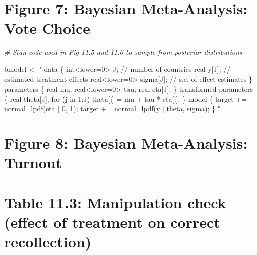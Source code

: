 \documentclass[]{article}
\newenvironment{Shaded}{\begin{snugshade}}{\end{snugshade}}
\newcommand{\StringTok}[1]{\textcolor[rgb]{0.31,0.60,0.02}{{#1}}}
\newcommand{\CommentTok}[1]{\textcolor[rgb]{0.56,0.35,0.01}{\textit{{#1}}}}
\newcommand{\NormalTok}[1]{{#1}}
\begin{document}
\clearpage

\section{Figure 7: Bayesian Meta-Analysis: Vote
Choice}\label{figure-7-bayesian-meta-analysis-vote-choice}

\begin{Shaded}
\begin{Highlighting}[]
\CommentTok{# Stan code used in Fig 11.5 and 11.6 to sample from posterior distributions}

  \NormalTok{bmodel <-}\StringTok{ "}
\StringTok{  data \{}
\StringTok{    int<lower=0> J; // number of countries }
\StringTok{    real y[J]; // estimated treatment effects}
\StringTok{    real<lower=0> sigma[J]; // s.e. of effect estimates }
\StringTok{  \}}
\StringTok{  parameters \{}
\StringTok{    real mu; }
\StringTok{    real<lower=0> tau;}
\StringTok{    real eta[J];}
\StringTok{  \}}
\StringTok{  transformed parameters \{}
\StringTok{    real theta[J];}
\StringTok{    for (j in 1:J)}
\StringTok{      theta[j] = mu + tau * eta[j];}
\StringTok{  \}}
\StringTok{  model \{}
\StringTok{    target += normal_lpdf(eta | 0, 1);}
\StringTok{    target += normal_lpdf(y | theta, sigma);}
\StringTok{  \}}
\StringTok{  "}
\end{Highlighting}
\end{Shaded}

\clearpage

\section{Figure 8: Bayesian Meta-Analysis:
Turnout}\label{figure-8-bayesian-meta-analysis-turnout}

\clearpage

\section{Table 11.3: Manipulation check (effect of treatment on correct
recollection)}\label{table-11.3-manipulation-check-effect-of-treatment-on-correct-recollection}
\end{document}
